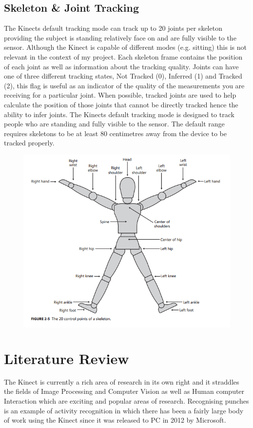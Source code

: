 \subsection{Skeleton \& Joint Tracking}
The Kinects default tracking mode can track up to 20 joints per skeleton providing the subject is standing relatively face on and are fully visible to the sensor. Although the Kinect is capable of different modes (e.g. sitting) this is not relevant in the context of my project.
Each skeleton frame contains the position of each joint as well as information about the tracking quality. Joints can have one of three different tracking states,  Not Tracked (0), Inferred (1) and Tracked (2), this flag is useful as an indicator of the quality of the measurements you are receiving for a particular joint. When possible, tracked joints are used to help calculate the position of those joints that cannot be directly tracked hence the ability to infer joints. The Kinects default tracking mode is designed to track people who are standing and fully visible to the sensor. The default range requires skeletons to be at least 80 centimetres away from the device to be tracked properly.

\begin{figure}[h]
    \centering
    \includegraphics[height=0.40\textheight]{fig02/kinSkel}
    \label{fig:kinskel}
\end{figure}

\section{Literature Review}
The Kinect is currently a rich area of research in its own right and it straddles the fields of Image Processing and Computer Vision as well as Human computer Interaction which are exciting and popular areas of research. Recognising punches is an example of activity recognition in which there has been a fairly large body of work using the Kinect since it was released to PC in 2012 by Microsoft.

